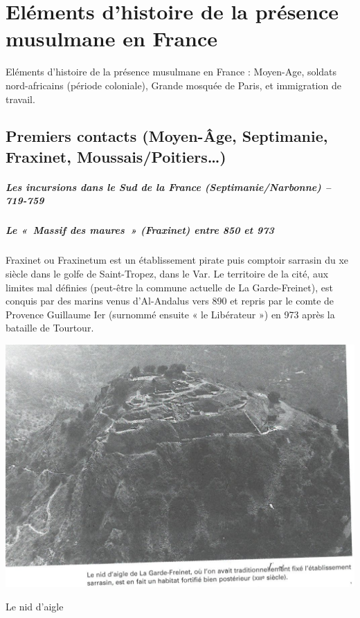 \chapter{Eléments d’histoire de la présence musulmane en France}

Eléments d’histoire de la présence musulmane en France : Moyen-Age, soldats
nord-africains (période coloniale), Grande mosquée de Paris, et immigration de
travail.

\section{Premiers contacts (Moyen-Âge, Septimanie, Fraxinet, Moussais/Poitiers…)}



\paragraph{Les incursions dans le Sud de la France (Septimanie/Narbonne) – 719-759}


\paragraph{Le « Massif des maures » (Fraxinet) entre 850 et 973}
 
 Fraxinet ou Fraxinetum est un établissement pirate puis comptoir  sarrasin du xe siècle dans le golfe de Saint-Tropez, dans le Var. Le territoire de la cité, aux limites mal définies (peut-être la commune actuelle de La Garde-Freinet), est conquis par des marins venus d'Al-Andalus vers 890 et repris par le comte de Provence Guillaume Ier (surnommé ensuite « le Libérateur ») en 973 après la bataille de Tourtour.
 
 \begin{marginfigure}
    \centering
    \includegraphics[width=\textwidth]{Images/nidAigle.png}
    \caption{Le nid d'aigle}
    \label{fig:nidAigle}
\end{marginfigure}

